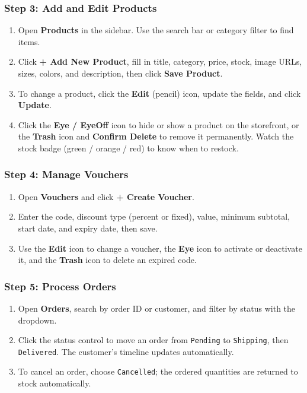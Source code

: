 \documentclass[12pt,a4paper,oneside]{report}
\begin{document}
\subsubsection{Step 3: Add and Edit Products}
\begin{enumerate}[leftmargin=1.2cm]
    \item Open \textbf{Products} in the sidebar. Use the search bar or category filter to find items.
    \item Click \textbf{+ Add New Product}, fill in title, category, price, stock, image URLs, sizes, colors, and description, then click \textbf{Save Product}.
    \item To change a product, click the \textbf{Edit} (pencil) icon, update the fields, and click \textbf{Update}.
    \item Click the \textbf{Eye / EyeOff} icon to hide or show a product on the storefront, or the \textbf{Trash} icon and \textbf{Confirm Delete} to remove it permanently. Watch the stock badge (green / orange / red) to know when to restock.
\end{enumerate}

\subsubsection{Step 4: Manage Vouchers}
\begin{enumerate}[leftmargin=1.2cm]
    \item Open \textbf{Vouchers} and click \textbf{+ Create Voucher}.
    \item Enter the code, discount type (percent or fixed), value, minimum subtotal, start date, and expiry date, then save.
    \item Use the \textbf{Edit} icon to change a voucher, the \textbf{Eye} icon to activate or deactivate it, and the \textbf{Trash} icon to delete an expired code.
\end{enumerate}

\subsubsection{Step 5: Process Orders}
\begin{enumerate}[leftmargin=1.2cm]
    \item Open \textbf{Orders}, search by order ID or customer, and filter by status with the dropdown.
    \item Click the status control to move an order from \texttt{Pending} to \texttt{Shipping}, then \texttt{Delivered}. The customer's timeline updates automatically.
    \item To cancel an order, choose \texttt{Cancelled}; the ordered quantities are returned to stock automatically.
\end{enumerate}
\end{document}
